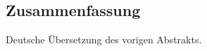 \newpage
\begin{otherlanguage}{ngerman}
\chapter*{Zusammenfassung}
Deutsche Übersetzung des vorigen Abstrakts.

\end{otherlanguage}

\endgroup

\vfill

\color{black}